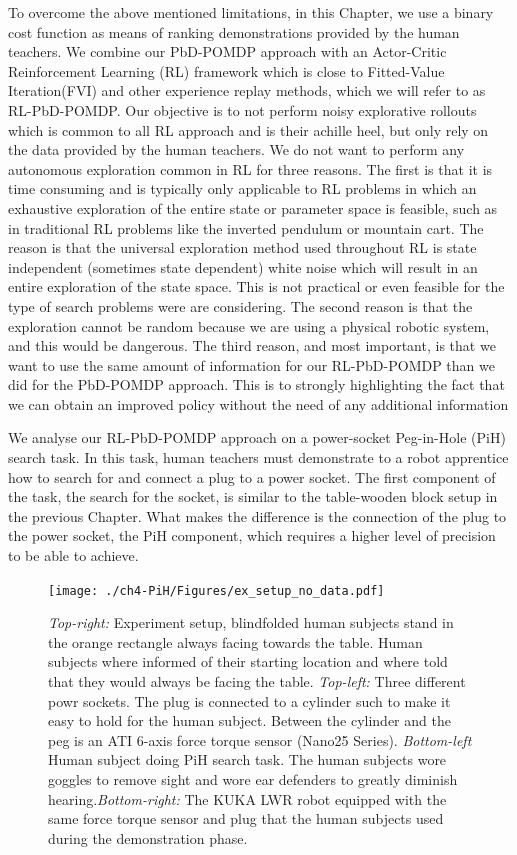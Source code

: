 To overcome the above mentioned limitations, in this Chapter, we use a binary cost function as means of ranking demonstrations provided 
by the human teachers. We combine our PbD-POMDP approach with an Actor-Critic Reinforcement Learning (RL) framework which is close to 
Fitted-Value Iteration(FVI) and other experience replay methods, which we will refer to as RL-PbD-POMDP. Our objective 
is to not perform noisy explorative rollouts which is common to all RL approach and is their achille heel, but only rely on 
the data provided by the human teachers. We do not want to perform any autonomous exploration common in RL for three reasons. 
The first is that it is time consuming and is typically only applicable to RL problems in which an exhaustive exploration 
of the entire state or parameter space is feasible, such as in traditional RL problems like the inverted pendulum or mountain cart. 
The reason is that the universal exploration method used throughout RL is state independent (sometimes state dependent) white noise 
which will result in an entire exploration of the state space. This
is not practical or even feasible for the type of search problems were are considering. The second reason is that the 
exploration cannot be random because we are using a physical robotic system, and this would be dangerous. The third reason, 
and most important, is that we want to use the same amount of information for our RL-PbD-POMDP than we did for the PbD-POMDP approach. 
This is to strongly highlighting the fact that we can obtain an improved policy without the need of any additional information

We analyse our RL-PbD-POMDP approach on a power-socket Peg-in-Hole (PiH) search task. In this task, human teachers must demonstrate 
to a robot apprentice how to search for and connect a plug to a power socket. The first component of the task, the search for the 
socket, is similar to the table-wooden block setup in the previous Chapter. What makes the difference is the connection of the  
plug to the power socket, the PiH component, which requires a higher level of precision to be able to achieve.

\begin{figure}[h]
  \centering
  \texttt{[image: ./ch4-PiH/Figures/ex\_setup\_no\_data.pdf]}
     \caption{\textit{Top-right:} Experiment setup, blindfolded human subjects stand in the orange rectangle always 
   facing towards the table. Human subjects where informed of their starting location and where told that 
   they would always be facing the table. \textit{Top-left:} Three different powr sockets. The plug is connected
   to a cylinder such to make it easy to hold for the human subject. Between the cylinder and the peg is 
   an ATI 6-axis force torque sensor (Nano25 Series). \textit{Bottom-left} Human subject doing PiH search task. 
   The human subjects wore goggles to remove sight and wore ear defenders to greatly diminish 
   hearing.\textit{Bottom-right:} The KUKA LWR robot equipped with the same force torque sensor and plug that 
   the human subjects used during the demonstration phase.}
  \label{fig:experiment_setup}
\end{figure}

